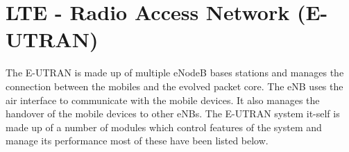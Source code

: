 \section{LTE - Radio Access Network (E-UTRAN)}
{
    The E-UTRAN is made up of multiple eNodeB bases stations and manages the connection between the mobiles and the evolved packet core. The eNB uses the air interface to communicate with the mobile devices. It also manages the handover of the mobile devices to other eNBs\cite{tutorialspoint2018}. The E-UTRAN system it-self is made up of a number of modules which control features of the system and manage its performance most of these have been listed below.
}